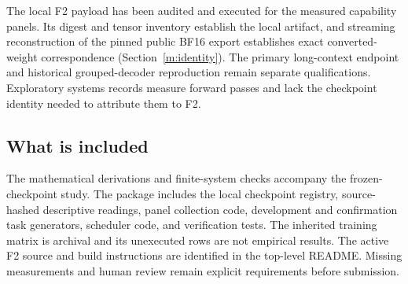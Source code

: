 \documentclass{article}
\theoremstyle{remark}\newtheorem{remark}[theorem]{Remark}
\begin{document}
The local F2 payload has been audited and executed for the measured capability panels. Its digest and tensor inventory establish the local artifact, and streaming reconstruction of the pinned public BF16 export establishes exact converted-weight correspondence (Section~\ref{m:identity}). The primary long-context endpoint and historical grouped-decoder reproduction remain separate qualifications. Exploratory systems records measure forward passes and lack the checkpoint identity needed to attribute them to F2.

\subsection{What is included}
The mathematical derivations and finite-system checks accompany the frozen-checkpoint study. The package includes the local checkpoint registry, source-hashed descriptive readings, panel collection code, development and confirmation task generators, scheduler code, and verification tests. The inherited training matrix is archival and its unexecuted rows are not empirical results. The active F2 source and build instructions are identified in the top-level README. Missing measurements and human review remain explicit requirements before submission.
\end{document}
